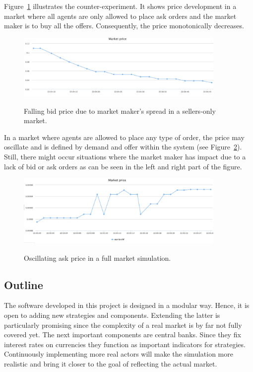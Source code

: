 Figure~\ref{fig:mm-buys} illustrates the counter-experiment. It shows price development
in a market where all agents are only allowed to place ask orders and the market maker 
is to buy all the offers. Consequently, the price monotonically decreases.

\begin{figure}[h]
\center
\includegraphics[width=0.9\textwidth]{img/examples/simulation-mad-sells-mm-buys.png} 
\label{fig:mm-buys}
\caption{Falling bid price due to market maker's spread in a sellers-only market.}
\end{figure}

In a market where agents are allowed to place any type of order, the price may oscillate
and is defined by demand and offer within the system (see Figure~\ref{fig:both}). 
Still, there might occur situations where the market maker has impact due to a lack of
bid or ask orders as can be seen in the left and right part of the figure.

\begin{figure}[h]
\center
\includegraphics[width=0.9\textwidth]{img/examples/simulation-sell-and-buy.png} 
\label{fig:both}
\caption{Oscillating ask price in a full market simulation.}
\end{figure}

\subsection{Outline}
The software developed in this project is designed in a modular way. Hence, it is open
to adding new strategies and components. Extending the latter is particularly 
promising since the complexity of a real market is by far not fully covered yet. The next
important components are central banks. Since they fix interest rates on currencies 
they function as important indicators for strategies. Continuously implementing more
real actors will make the simulation more realistic and bring it closer to the goal 
of reflecting the actual market.

